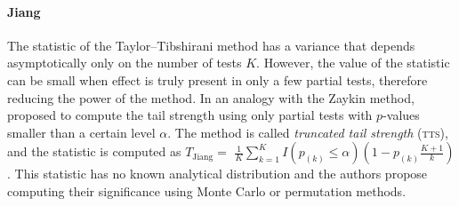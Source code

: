 \paragraph{Jiang} The statistic of the Taylor--Tibshirani method has a variance that depends asymptotically only on the number of tests $K$. However, the value of the statistic can be small when effect is truly present in only a few partial tests, therefore reducing the power of the method. In an analogy with the Zaykin method, \citet{Jiang2011} proposed to compute the tail strength using only partial tests with $p$-values smaller than a certain level $\alpha$. The method is called \emph{truncated tail strength} (\textsc{tts}), and the statistic is computed as $T_{\text{Jiang}} =$ $\frac{1}{K} \sum_{k=1}^{K} I\left(p_{(k)}\leqslant \alpha \right)\left(1-p_{(k)}\frac{K+1}{k}\right)$. This statistic has no known analytical distribution and the authors propose computing their significance using Monte Carlo or permutation methods.
